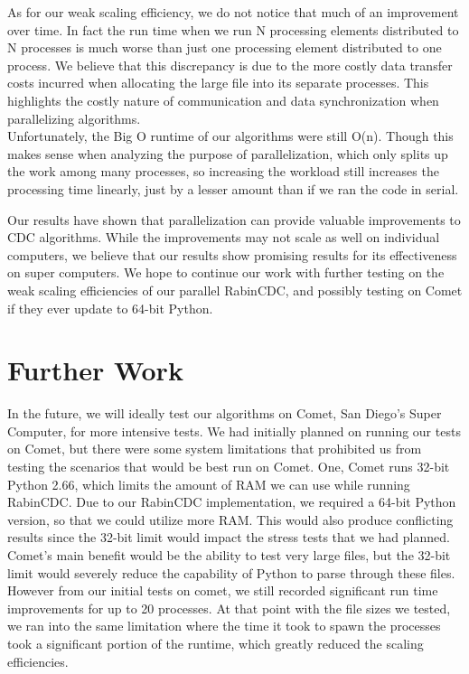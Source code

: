 \documentclass{acmtog} %
\begin{document}
	As for our weak scaling efficiency, we do not notice that much of an improvement over time. In fact the run time when we run N processing elements distributed to N processes is much worse than just one processing element distributed to one process. We believe that this discrepancy is due to the more costly data transfer costs incurred when allocating the large file into its separate processes. This highlights the costly nature of communication and data synchronization when parallelizing algorithms.\\

	
	Unfortunately, the Big O runtime of our algorithms were still O(n). Though this makes sense when analyzing the purpose of parallelization, which only splits up the work among many processes, so increasing the workload still increases the processing time linearly, just by a lesser amount than if we ran the code in serial. 
	
	Our results have shown that parallelization can provide valuable improvements to CDC algorithms. While the improvements may not scale as well on individual computers, we believe that our results show promising results for its effectiveness on super computers. We hope to continue our work with further testing on the weak scaling efficiencies of our parallel RabinCDC, and possibly testing on Comet if they ever update to 64-bit Python. 

	\section{Further Work}
	In the future, we will ideally test our algorithms on Comet, San Diego's Super Computer, for more intensive tests. We had initially planned on running our tests on Comet, but there were some system limitations that prohibited us from testing the scenarios that would be best run on Comet. One, Comet runs 32-bit Python 2.66, which limits the amount of RAM we can use while running RabinCDC. Due to our RabinCDC implementation, we required a 64-bit Python version, so that we could utilize more RAM. This would also produce conflicting results since the 32-bit limit would impact the stress tests that we had planned. Comet's main benefit would be the ability to test very large files, but the 32-bit limit would severely reduce the capability of Python to parse through these files. However from our initial tests on comet, we still recorded significant run time improvements for up to 20 processes. At that point with the file sizes we tested, we ran into the same limitation where the time it took to spawn the processes took a significant portion of the runtime, which greatly reduced the scaling efficiencies. 
	
\end{document}
